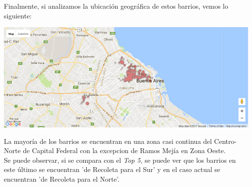 \documentclass[a4paper, 10pt]{article}
\newcommand\tab[1][0.5cm]{\hspace*{#1}}
\begin{document}
				  	\tab Finalmente, si analizamos la ubicación geográfica de estos barrios, vemos lo siguiente:
				  	\begin{center}
   		    				\includegraphics[width=\textwidth]{../images/storeSurfaceBottomMap}
				  	\end{center}
				  	\tab La mayoría de los barrios se encuentran en una zona casi continua del Centro-Norte de Capital Federal con
				  	la excepcion de Ramos Mejía en Zona Oeste. \\
				  	\tab Se puede observar, si se compara con el \emph{Top 5}, se puede ver que los barrios en este último se
				  	encuentran 'de Recoleta para el Sur' y en el caso actual se encuentran 'de Recoleta para el Norte'. 
\end{document}
